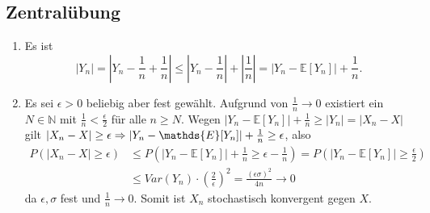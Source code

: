 \documentclass[a4paper]{article}
\begin{document}
\makeexheaderger

\subsection{Zentralübung}

\begin{enumerate}[label=(\alph*)]
    \item Es ist 
    \begin{equation*}
        |Y_n| = \left|Y_n - \frac{1}{n} + \frac{1}{n}\right| \leq \left| Y_n - \frac{1}{n} \right| + \left| \frac{1}{n} \right| = |Y_n - \mathds{E}[Y_n]| + \frac{1}{n}\text{.}
    \end{equation*}
    \item Es sei $\epsilon > 0$ beliebig aber fest gewählt.
    Aufgrund von $\frac{1}{n} \to 0$ existiert ein $N \in \mathds{N}$ mit $\frac{1}{n} < \frac{\epsilon}{2}$ für alle $n \geq N$.
    Wegen $|Y_n - \mathds{E}[Y_n]| + \frac{1}{n} \geq |Y_n| = |X_n - X|$ gilt $|X_n - X| \geq \epsilon \then |Y_n - \mathds{E}[Y_n]| + \frac{1}{n} \geq \epsilon$, also 
    \begin{align*}
        P(|X_n - X| \geq \epsilon) &\leq P(|Y_n - \mathds{E}[Y_n]| + \frac{1}{n} \geq \epsilon - \frac{1}{n}) = P(|Y_n - \mathds{E}[Y_n]| \geq \frac{\epsilon}{2}) \\
        &\leq Var(Y_n) \cdot \left(\frac{2}{\epsilon}\right)^2 = \frac{(\epsilon \sigma)^2}{4n} \to 0
    \end{align*}
    da $\epsilon, \sigma$ fest und $\frac{1}{n} \to 0$.
    Somit ist $X_n$ stochastisch konvergent gegen $X$.
\end{enumerate}

\subsection{}

\subsection{}


\subsection{}
\end{document}
